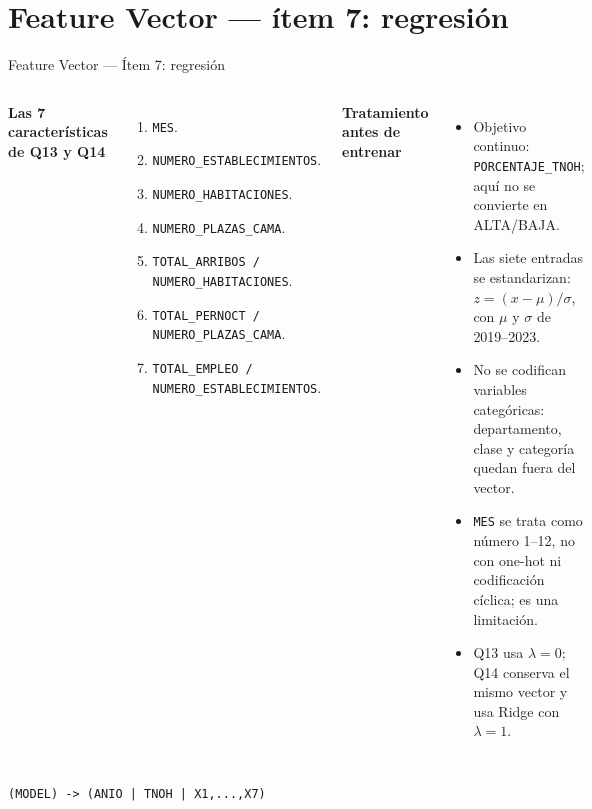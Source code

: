 \documentclass{beamer}
\begin{document}
\section{Feature Vector — ítem 7: regresión}

\begin{frame}{Feature Vector — Ítem 7: regresión}
\scriptsize
\begin{columns}[T,onlytextwidth]
\textbf{Las 7 características de Q13 y Q14}
\begin{enumerate}\setlength\itemsep{1pt}
  \item \texttt{MES}.
  \item \texttt{NUMERO\_ESTABLECIMIENTOS}.
  \item \texttt{NUMERO\_HABITACIONES}.
  \item \texttt{NUMERO\_PLAZAS\_CAMA}.
  \item \texttt{TOTAL\_ARRIBOS / NUMERO\_HABITACIONES}.
  \item \texttt{TOTAL\_PERNOCT / NUMERO\_PLAZAS\_CAMA}.
  \item \texttt{TOTAL\_EMPLEO / NUMERO\_ESTABLECIMIENTOS}.
\end{enumerate}

\textbf{Tratamiento antes de entrenar}
\begin{itemize}\setlength\itemsep{2pt}
  \item Objetivo continuo: \texttt{PORCENTAJE\_TNOH}; aquí no se convierte en ALTA/BAJA.
  \item Las siete entradas se estandarizan: $z=(x-\mu)/\sigma$, con $\mu$ y $\sigma$ de 2019--2023.
  \item No se codifican variables categóricas: departamento, clase y categoría quedan fuera del vector.
  \item \texttt{MES} se trata como número 1--12, no con one-hot ni codificación cíclica; es una limitación.
  \item Q13 usa $\lambda=0$; Q14 conserva el mismo vector y usa Ridge con $\lambda=1$.
\end{itemize}
\end{columns}

\centering
\texttt{(MODEL) -> (ANIO | TNOH | X1,...,X7)}
\end{frame}
\end{document}
